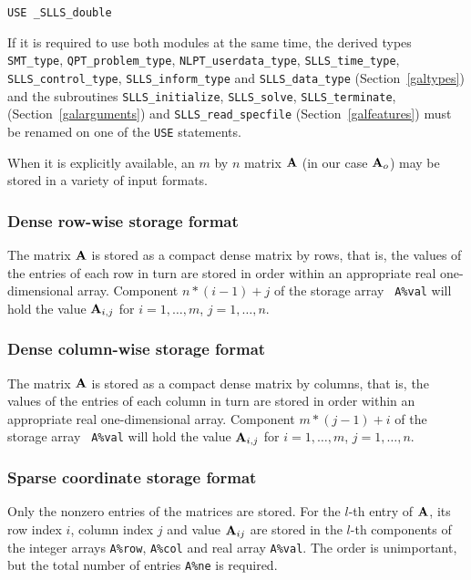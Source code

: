 \documentclass{galahad}
\newcommand{\packagename}{SLLS}
\newcommand{\fullpackagename}{\libraryname\_\packagename}
\begin{document}
\hspace{8mm} {\tt USE  \fullpackagename\_double}

\medskip

\noindent
If it is required to use both modules at the same time, the derived types
{\tt SMT\_type},
{\tt QPT\_problem\_type},
{\tt NLPT\_userdata\-\_type},
{\tt \packagename\_time\_type},
{\tt \packagename\_control\_type},
{\tt \packagename\_inform\_type}
and
{\tt \packagename\_data\_type}
(Section~\ref{galtypes})
and the subroutines
{\tt \packagename\_initialize},
{\tt \packagename\_\-solve},
{\tt \packagename\_terminate},
(Section~\ref{galarguments})
and
{\tt \packagename\_read\_specfile}
(Section~\ref{galfeatures})
must be renamed on one of the {\tt USE} statements.


\galmatrix
When it is explicitly available, an $m$ by $n$ matrix ${\mathbf{A}}$ 
(in our case ${\mathbf{A}}_o$) may be stored in a variety of input formats.

\subsubsection{Dense row-wise storage format}\label{dense-row}
The matrix ${\mathbf{A}}$ is stored as a compact dense matrix by rows,
that is, the values of the entries of each row in turn are
stored in order within an appropriate real one-dimensional array.
Component $n \ast (i-1) + j$ of the storage array {\tt
  A\%val} will hold the value ${\mathbf{A}}_{i,j}$ for $i = 1, \ldots , m$, $j =
1, \ldots , n$.

\subsubsection{Dense column-wise storage format}\label{dense-column}
The matrix ${\mathbf{A}}$ is stored as a compact
dense matrix by columns, that is, the values of the entries of each column
in turn are stored in order within an appropriate real one-dimensional array.
Component $m \ast (j-1) + i$ of the storage array {\tt
  A\%val} will hold the value ${\mathbf{A}}_{i,j}$ for $i = 1, \ldots , m$, $j =
1, \ldots , n$.

\subsubsection{Sparse coordinate storage format}\label{coordinate}
Only the nonzero entries of the matrices are stored. For the $l$-th
entry of ${\mathbf{A}}$, its row index $i$, column index $j$ and value
${\mathbf{A}}_{ij}$ are stored in the $l$-th components of the integer arrays
{\tt A\%row}, {\tt A\%col} and real array {\tt A\%val}.
The order is unimportant, but the total number of entries {\tt A\%ne} is
required.
\end{document}
